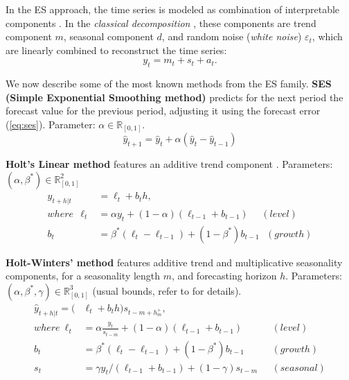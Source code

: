 In the ES approach, the time series is modeled as combination of  interpretable components \cite{brockwell1990methods}. In the \textit{classical decomposition} \cite{makridakis1997arma}, these components are trend component $m$, seasonal component $d$, and random noise (\textit{white noise}) $\varepsilon_t$, which are linearly combined to reconstruct the time series:
\begin{equation}\label{eq:ts_classical_decomp}
    y_t = m_t + s_t + a_t .
\end{equation}

We now describe some of the most known methods from the ES family.
\noindent
\textbf{SES (Simple Exponential Smoothing method)} predicts for the next period the forecast value for the previous period, adjusting it using the forecast error (\ref{eq:ses}). Parameter: $\alpha \in \mathbb{R}_{[0,1]}$.
\begin{equation}\label{eq:ses}
    \hat{y}_{t+1} = \hat{y}_{t} + \alpha(\hat{y}_{t} - \hat{y}_{t-1})
\end{equation}

\noindent
\textbf{Holt's Linear method} features an additive trend component \cite{hyndman2008es}. Parameters: $(\alpha, \beta^*) \in \mathbb{R}^2_{[0,1]}$
\begin{equation}\label{eq:holt_linear}
    \begin{aligned}
    \hat{y}_{t+h|t} &= \ell_t + b_th, \\
    where\ \  \ell_t &= \alpha y_t + (1-\alpha)(\ell_{t-1}+b_{t-1}) \ \ \ \ \ \ (level) \\
    b_t &= \beta^*(\ell_t - \ell_{t-1}) + (1-\beta^*)b_{t-1} \ \ \ (growth)
    \end{aligned}
\end{equation}

\noindent
\textbf{Holt-Winters' method} features additive trend and multiplicative seasonality components, for a seasonality length $m$, and forecasting horizon $h$. Parameters: $(\alpha, \beta^*,\gamma) \in \mathbb{R}^3_{[0,1]}$ (usual bounds, refer to \cite{hyndman2008es} for details).
\begin{equation}\label{eq:hs_method}
    \begin{aligned}
    \hat{y}_{t+h|t} = (&\ell_t + b_th)s_{t-m+h^+_m}, \\
    where \ \ell_t &= \alpha \frac{y_t}{s_{t-m}} + (1-\alpha)(\ell_{t-1}+b_{t-1})   &(level) \\
    b_t &= \beta^*(\ell_t - \ell_{t-1}) + (1-\beta^*)b_{t-1} &(growth) \\
    s_t &= \gamma y_t/(\ell_{t-1}+b_{t-1}) + (1-\gamma)s_{t-m} \ \ \ &(seasonal)
    \end{aligned}
\end{equation}

